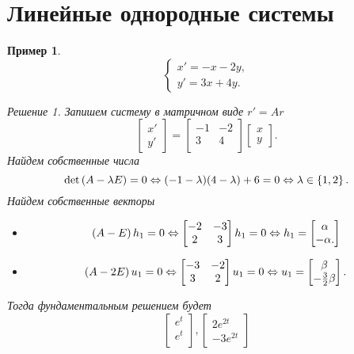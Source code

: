 \documentclass[a5paper, 11pt]{article}
\theoremstyle{definition}
\theoremstyle{plain}
\newtheorem{Ex}{Пример}
\theoremstyle{remark}
\newtheorem*{Solution}{Решение}
\begin{document}
	\section[23.12.2022]{Линейные однородные системы}
	\begin{Ex}
		\[
		\begin{cases}
			x' = -x-2y,\\
			y'=3x+4y.
		\end{cases}
		\]
		\begin{Solution}
			Запишем систему в матричном виде $r' = A r$
			\[
			\begin{bmatrix}
				x'\\y'
			\end{bmatrix}
			=
			\begin{bmatrix}
				-1 &-2\\
				3 & 4\\
			\end{bmatrix}
			\begin{bmatrix}
				x\\y
			\end{bmatrix}.
			\]
			Найдем собственные числа
			\[
			\det \left(A-\lambda E\right) = 0 \Leftrightarrow (-1-\lambda)(4-\lambda) + 6 = 0 \Leftrightarrow \lambda \in \left\{1,2\right\}.
			\]
			Найдем собственные векторы
			\begin{itemize}
				\item[$\boxed{\lambda = 1}$]
				\[
				\left(A-E\right) h_1 = 0 \Leftrightarrow \begin{bmatrix}
					-2 & -3\\
					2 & 3
				\end{bmatrix}h_1 = 0 \Leftrightarrow h_1 = \begin{bmatrix}
					\alpha\\-\alpha.
				\end{bmatrix}
				\]
				\item[$\boxed{\lambda = 2}$]
				\[
				\left(A-2E\right) u_1 = 0 \Leftrightarrow \begin{bmatrix}
					-3 & -2\\
					3 & 2
				\end{bmatrix}u_1 = 0 \Leftrightarrow u_1 = \begin{bmatrix}
			\beta\\
			-\frac32 \beta
		\end{bmatrix}.
				\]
			\end{itemize}
		Тогда фундаментальным решением будет 
		\[
		\begin{bmatrix}
			e^{t}\\
			e^{t}\\
		\end{bmatrix},
		\begin{bmatrix}
			2e^{2t}\\
			-3e^{2t}
		\end{bmatrix}
		\]
		\end{Solution}
	\end{Ex}
\end{document}
